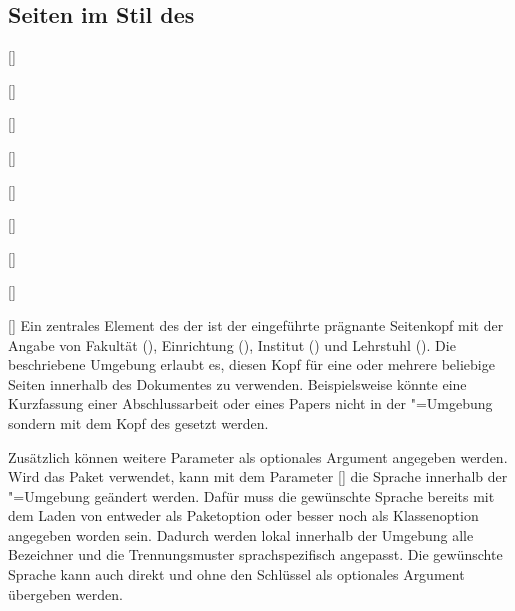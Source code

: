\documentclass[%
  english,ngerman,%
  headings=optiontoheadandtoc,captions=tableheading,numbers=noenddot,%
  chapterpage,cdfoot,%
]{tudscrman}
\begin{document}
\subsection{Seiten im Stil des \CDs}
\begin{Declaration}{[]}
\begin{Declaration}{[]}
\begin{Declaration}{[\PSet]}
\begin{Declaration}{[]}
\begin{Declaration}{[]}
\begin{Declaration}{[\PBoolean]}
\begin{Declaration}{[\PSet]}
\begin{Declaration}{[\PSet]}
\begin{Declaration}{[]}
\printdeclarationlist%
%
%
%
%
Ein zentrales Element des \CDs der \TnUD ist der eingeführte prägnante 
Seitenkopf mit der Angabe von Fakultät (), Einrichtung 
(), Institut () und Lehrstuhl 
(). Die beschriebene Umgebung erlaubt es, diesen Kopf für eine oder 
mehrere beliebige Seiten innerhalb des Dokumentes zu verwenden. Beispielsweise 
könnte eine Kurzfassung einer Abschlussarbeit oder eines Papers nicht in der 
"=Umgebung sondern mit dem Kopf des \CDs gesetzt werden.

Zusätzlich können weitere Parameter als optionales Argument angegeben werden. 
Wird das Paket  verwendet, kann mit dem Parameter 
[] die Sprache innerhalb 
der "=Umgebung geändert werden. Dafür muss die gewünschte 
Sprache bereits mit dem Laden von  entweder als Paketoption oder 
besser noch als Klassenoption angegeben worden sein. Dadurch werden lokal 
innerhalb der Umgebung alle Bezeichner und die Trennungsmuster sprachspezifisch 
angepasst. Die gewünschte Sprache kann auch direkt und ohne den Schlüssel 
 als optionales Argument übergeben werden.


\end{Declaration}
\end{Declaration}
\end{Declaration}
\end{Declaration}
\end{Declaration}
\end{Declaration}
\end{Declaration}
\end{Declaration}
\end{Declaration}
\end{document}
